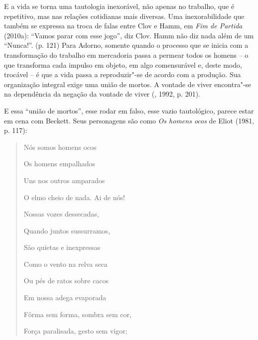 {E a vida se torna uma tautologia inexorável, não apenas no trabalho, que
é repetitivo, mas nas relações cotidianas mais diversas. Uma
inexorabilidade que também se expressa na troca de falas entre Clov e
Hamm, em \emph{Fim de Partida} (2010a): ``Vamos parar com esse jogo'',
diz Clov. Hamm não diz nada além de um ``Nunca!''. (p. 121) Para Adorno,
somente quando o processo que se inicia com a transformação do trabalho
em mercadoria passa a permear todos os homens -- o que transforma cada
impulso em objeto, em algo comensurável e, deste modo, trocável -- é que
a vida passa a reproduzir"-se de acordo com a produção. Sua organização
integral exige uma união de mortos. A vontade de viver encontra"-se na
dependência da negação da vontade de viver (, 1992, p. 201).

E essa ``união de mortos'', esse rodar em falso, esse vazio tautológico,
parece estar em cena com Beckett. Seus personagens são como \emph{Os
homens ocos} de Eliot (1981, p. 117):

\begin{quote}
\forceindent{}Nós somos homens ocos

Os homens empalhados

Uns nos outros amparados

O elmo cheio de nada. Ai de nós!

Nossas vozes dessecadas,

Quando juntos sussurramos,

São quietas e inexpressas

Como o vento na relva seca

Ou pés de ratos sobre cacos

Em nossa adega evaporada

Fôrma sem forma, sombra sem cor,

Força paralisada, gesto sem vigor;
\end{quote}

}
